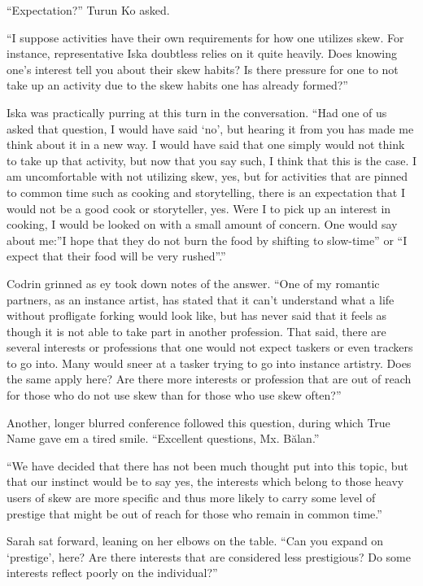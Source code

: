 ``Expectation?'' Turun Ko asked.

``I suppose activities have their own requirements for how one utilizes skew. For instance, representative Iska doubtless relies on it quite heavily. Does knowing one's interest tell you about their skew habits? Is there pressure for one to not take up an activity due to the skew habits one has already formed?''

Iska was practically purring at this turn in the conversation. ``Had one of us asked that question, I would have said `no', but hearing it from you has made me think about it in a new way. I would have said that one simply would not think to take up that activity, but now that you say such, I think that this is the case. I am uncomfortable with not utilizing skew, yes, but for activities that are pinned to common time such as cooking and storytelling, there is an expectation that I would not be a good cook or storyteller, yes. Were I to pick up an interest in cooking, I would be looked on with a small amount of concern. One would say about me:''I hope that they do not burn the food by shifting to slow-time'' or ``I expect that their food will be very rushed''.''

Codrin grinned as ey took down notes of the answer. ``One of my romantic partners, as an instance artist, has stated that it can't understand what a life without profligate forking would look like, but has never said that it feels as though it is not able to take part in another profession. That said, there are several interests or professions that one would not expect taskers or even trackers to go into. Many would sneer at a tasker trying to go into instance artistry. Does the same apply here? Are there more interests or profession that are out of reach for those who do not use skew than for those who use skew often?''

Another, longer blurred conference followed this question, during which True Name gave em a tired smile. ``Excellent questions, Mx. Bălan.''

``We have decided that there has not been much thought put into this topic, but that our instinct would be to say yes, the interests which belong to those heavy users of skew are more specific and thus more likely to carry some level of prestige that might be out of reach for those who remain in common time.''

Sarah sat forward, leaning on her elbows on the table. ``Can you expand on `prestige', here? Are there interests that are considered less prestigious? Do some interests reflect poorly on the individual?''


